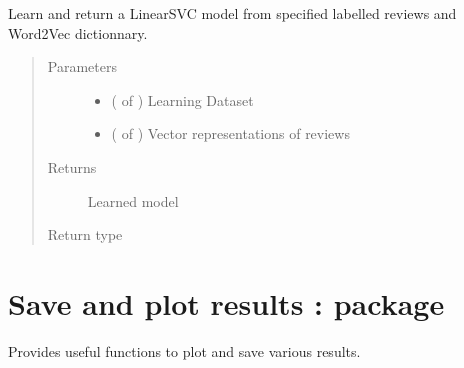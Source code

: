 \documentclass[letterpaper,10pt,english]{sphinxmanual}
\begin{document}

\begin{fulllineitems}
\label{\detokenize{learning:loacore.learning.svm.learn_model}}
Learn and return a LinearSVC model from specified labelled reviews and Word2Vec dictionnary.
\begin{quote}\begin{description}
\item[{Parameters}] \leavevmode\begin{itemize}
\item {} 
 ( of {\hyperref[\detokenize{classes:loacore.classes.classes.Review}]{}}) \textendash{} Learning Dataset

\item {} 
 ( of ) \textendash{} Vector representations of reviews

\end{itemize}

\item[{Returns}] \leavevmode
Learned model

\item[{Return type}] \leavevmode



\end{description}\end{quote}

\end{fulllineitems}



\chapter{Save and plot results :  package}
\label{\detokenize{utils:save-and-plot-results-utils-package}}\label{\detokenize{utils::doc}}
Provides useful functions to plot and save various results.
\end{document}
